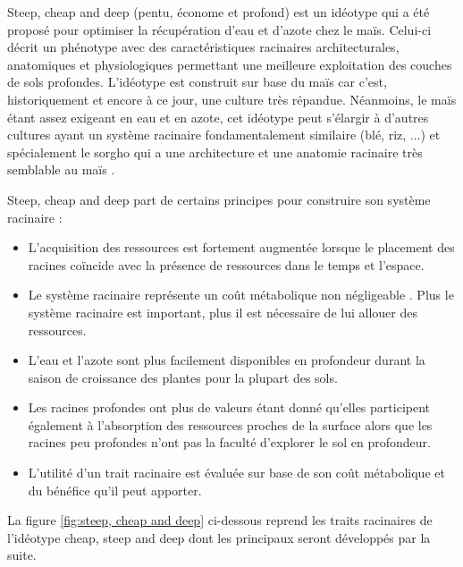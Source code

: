 Steep, cheap and deep (pentu, économe et profond) est un idéotype qui a été proposé pour optimiser la récupération d'eau et d'azote chez le maïs. 
Celui-ci décrit un phénotype avec des caractéristiques racinaires architecturales, anatomiques et physiologiques permettant une meilleure exploitation des couches de sols profondes.
L'idéotype est construit sur base du maïs car c'est, historiquement et encore à ce jour, une culture très répandue. 
Néanmoins, le maïs étant assez exigeant en eau et en azote, cet idéotype peut s'élargir à d'autres cultures ayant un système racinaire fondamentalement similaire (blé, riz, ...) et spécialement le sorgho qui a une architecture et une anatomie racinaire très semblable au maïs \citep{lynch_steep_2013}.
\newline

Steep, cheap and deep part de certains principes pour construire son système racinaire :

\begin{itemize}
    \item L'acquisition des ressources est fortement augmentée lorsque le placement des racines coïncide avec la présence de ressources dans le temps et l'espace.
    \item Le système racinaire représente un coût métabolique non négligeable \citep{kafkafi_respiratory_2002}. Plus le système racinaire est important, plus il est nécessaire de lui allouer des ressources.
    \item L'eau et l'azote sont plus facilement disponibles en profondeur durant la saison de croissance des plantes pour la plupart des sols.
    \item Les racines profondes ont plus de valeurs étant donné qu'elles participent également à l'absorption des ressources proches de la surface alors que les racines peu profondes n'ont pas la faculté d'explorer le sol en profondeur.
    \item L'utilité d'un trait racinaire est évaluée sur base de son coût métabolique et du bénéfice qu'il peut apporter.
\end{itemize}

La figure \ref{fig:steep, cheap and deep} ci-dessous reprend les traits racinaires de l'idéotype cheap, steep and deep dont les principaux seront développés par la suite.

